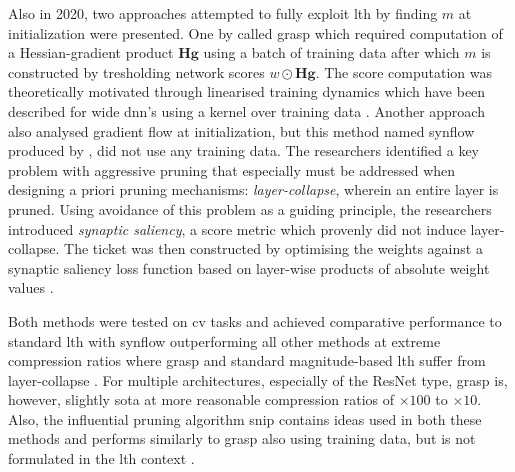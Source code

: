 \documentclass[12pt,fleqn,twocolumn]{article}
\begin{document}
Also in 2020, two approaches attempted to fully exploit \acrshort{lth} by finding $m$ at initialization were presented.
One by \textcite{Wang2020PickingWT} called \acrfull{grasp} which required computation of a Hessian-gradient product $\mathbf H \mathbf g$ using a batch of training data after which $m$ is constructed by tresholding network scores $w \odot \mathbf H \mathbf g$.
The score computation was theoretically motivated through linearised training dynamics \cite[Chap. 4.1]{Wang2020PickingWT} which have been described for wide \acrshort{dnn}'s using a kernel over training data \cite{Lee2019WideNN}.
Another approach also analysed gradient flow at initialization, but this method named \acrfull{synflow} produced by \textcite{Tanaka2020PruningNN}, did not use any training data.
The researchers identified a key problem with aggressive pruning that especially must be addressed when designing a priori pruning mechanisms: \emph{layer-collapse}, wherein an entire layer is pruned.
Using avoidance of this problem as a guiding principle, the researchers introduced \emph{synaptic saliency}, a score metric which provenly did not induce layer-collapse.
The ticket was then constructed by optimising the weights against a synaptic saliency loss function based on layer-wise products of absolute weight values \cite[Chap. 6]{Tanaka2020PruningNN}.

Both methods were tested on \acrshort{cv} tasks and achieved comparative performance to standard \acrshort{lth} with \acrshort{synflow} outperforming all other methods at extreme compression ratios where \acrshort{grasp} and standard magnitude-based \acrshort{lth} suffer from layer-collapse \cite[Chap. 7]{Tanaka2020PruningNN}.
For multiple architectures, especially of the ResNet type, \acrshort{grasp} is, however, slightly \acrshort{sota} at more reasonable compression ratios of $\times 100$ to $\times 10$\cite[Tab. 4]{Wang2020PickingWT}\cite[Fig. 6]{Tanaka2020PruningNN}.
Also, the influential pruning algorithm \acrfull{snip} contains ideas used in both these methods and performs similarly to \acrshort{grasp} also using training data, but is not formulated in the \acrshort{lth} context \cite{Lee2019SNIPSN}.
\end{document}
